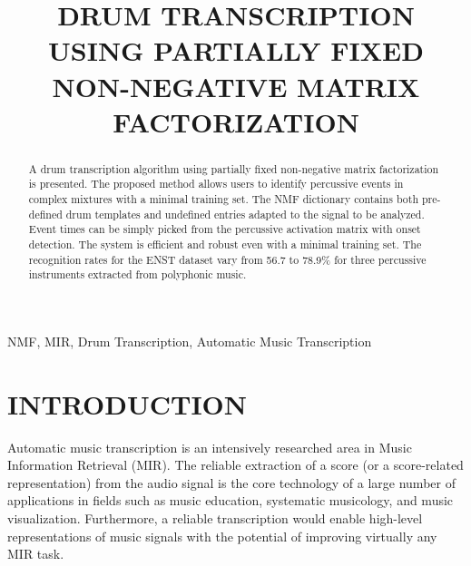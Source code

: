 \documentclass{article}
\title{DRUM TRANSCRIPTION USING PARTIALLY FIXED NON-NEGATIVE MATRIX FACTORIZATION}
\begin{document}
%
\maketitle
%
\begin{abstract}
A drum transcription algorithm using partially fixed non-negative matrix factorization is presented. The proposed method allows users to identify percussive events in complex mixtures with a minimal training set. The NMF dictionary contains both pre-defined drum templates and undefined entries adapted to the signal to be analyzed. Event times can be simply picked from the percussive activation matrix with onset detection. The system is efficient and robust even with a minimal training set. The recognition rates for the ENST dataset vary from 56.7 to 78.9\% for three percussive instruments extracted from polyphonic music. 
\end{abstract}
%
\begin{keywords}
NMF, MIR, Drum Transcription, Automatic Music Transcription
\end{keywords}
%
\section{INTRODUCTION}\label{sec:introduction}
Automatic music transcription is an intensively researched area in Music Information Retrieval (MIR). The reliable extraction of a score (or a score-related representation) from the audio signal is the core technology of a large number of applications in fields such as music education, systematic musicology, and music visualization. Furthermore, a reliable transcription would enable high-level representations of music signals with the potential of improving virtually any MIR task.

\end{document}
